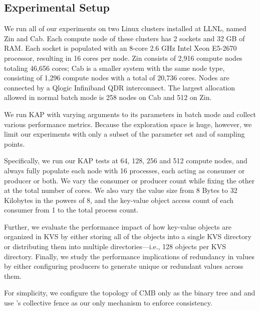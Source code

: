 \subsection{Experimental Setup}
We run all of our experiments on two Linux clusters installed at LLNL,
named Zin and Cab.
Each compute node of these clusters has 2 sockets and 32 GB of RAM.
Each socket is populated with an 8-core 2.6 GHz Intel
Xeon E5-2670 processor, resulting in 16 cores per node.
Zin consists of 2,916 compute nodes totaling 46,656 cores;
Cab is a smaller system with the same node type,
consisting of 1,296 compute nodes with a total of 20,736 cores.
Nodes are connected by a Qlogic Infiniband QDR interconnect.
The largest allocation allowed in normal batch mode
is 258 nodes on Cab and 512 on Zin.

We run KAP with varying arguments to its parameters
in batch mode and collect various 
performance metrics. 
Because the exploration
space is huge, however, we limit our experiments with
only a subset of the parameter set and of sampling points.

Specifically, we run our KAP tests at 64, 128, 256 and 512
compute nodes, and always fully populate each node with
16 processes, each acting as consumer or producer or
both. We vary the consumer or producer count
while fixing the other at the total number of cores.
We also vary the value size 
from 8 Bytes to 32 Kilobytes in the powers of 8,
and the key-value object access count of each consumer
from 1 to the total process count.

Further, we evaluate the performance impact 
of how key-value objects are organized 
in KVS by either storing all of the objects into a single KVS directory
or distributing them into multiple directories---i.e.,
128 objects per KVS directory.
Finally, we study the performance implications of 
redundancy in values by either configuring producers to generate
unique or redundant values across them.

For simplicity, we configure the topology of CMB only as 
the binary tree and and use \flux's collective fence 
as our only mechanism to enforce consistency.
